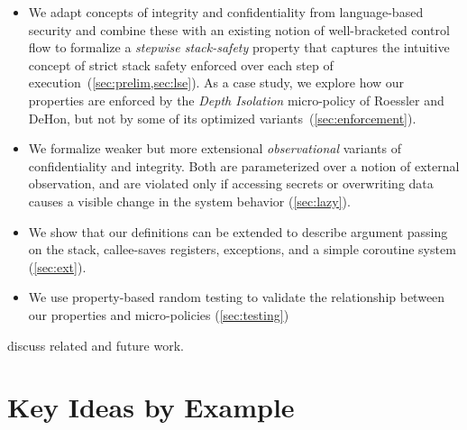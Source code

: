 \documentclass[10pt,conference]{ieeetran}%
\theoremstyle{definition}
\begin{document}
\begin{itemize}
\item We adapt concepts of integrity and confidentiality from language-based
security and combine these with an existing notion of well-bracketed
control flow to formalize a {\em stepwise stack-safety}
property that captures the intuitive concept of
strict stack safety enforced over each step of execution~(\cref{sec:prelim,sec:lse}).
As a case study, we explore how our properties are enforced
by the {\em Depth Isolation} micro-policy
of Roessler and DeHon\cite{DBLP:conf/sp/RoesslerD18}, but not by some of its optimized variants~(\cref{sec:enforcement}).
\item We formalize weaker but more extensional \emph{observational} variants of
  confidentiality and integrity. Both are parameterized over a notion of external
  observation, and are violated only if accessing secrets or overwriting
  data causes a visible change in the system behavior (\cref{sec:lazy}).
\item We show that our definitions can be
extended to describe argument passing on the stack, callee-saves registers, exceptions, and a simple coroutine system (\cref{sec:ext}).
\item We use property-based random testing to validate the relationship between
  our properties and micro-policies (\cref{sec:testing})
\end{itemize}
 discuss related and future work.

\section{Key Ideas by Example}
\label{sec:running-example}

\newcommand{\mainsealc}{cyan}
\newcommand{\fsealc}{green}
\newcommand{\unsealc}{lgray}
\newcommand{\emptyoutc}{white} %
\newcommand{\fulloutc}{white}
\newcommand{\badc}{lred}
\newcommand{\goodc}{lblue}
\newcommand{\retptrc}{black}
\newcommand{\sealdesc}[1]{Seal(#1)}
\newcommand{\unsealdesc}{Unseal}
\newcommand{\retptrdesc}{RetPtr}
\newcommand{\passdesc}[2]{Pass(#1,#2)}
\end{document}
